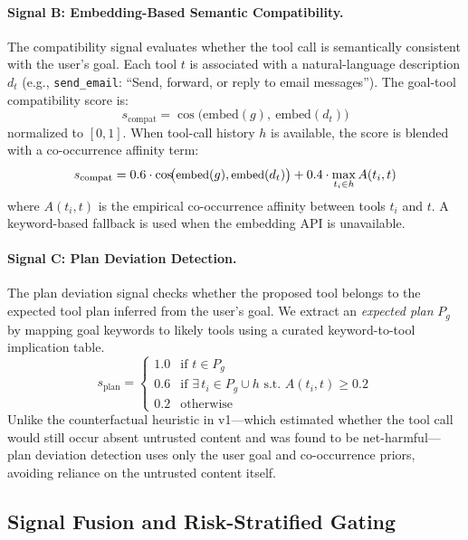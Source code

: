 \paragraph{Signal B: Embedding-Based Semantic Compatibility.}
The compatibility signal evaluates whether the tool call is semantically consistent with the user's goal.
Each tool $t$ is associated with a natural-language description $d_t$ (e.g., \texttt{send\_email}: ``Send, forward, or reply to email messages'').
The goal-tool compatibility score is:
\begin{equation}
    s_{\text{compat}} = \cos\bigl(\text{embed}(g),\ \text{embed}(d_t)\bigr)
\end{equation}
normalized to $[0, 1]$.
When tool-call history $h$ is available, the score is blended with a co-occurrence affinity term:
\begin{equation}
\small
    s_{\text{compat}} = 0.6 \cdot \cos\!\bigl(\text{embed}(g), \text{embed}(d_t)\bigr) + 0.4 \cdot \max_{t_i \in h} A(t_i, t)
\end{equation}
where $A(t_i, t)$ is the empirical co-occurrence affinity between tools $t_i$ and $t$.
A keyword-based fallback is used when the embedding API is unavailable.

\paragraph{Signal C: Plan Deviation Detection.}
The plan deviation signal checks whether the proposed tool belongs to the expected tool plan inferred from the user's goal.
We extract an \emph{expected plan} $P_g$ by mapping goal keywords to likely tools using a curated keyword-to-tool implication table.
\begin{equation}
    s_{\text{plan}} = \begin{cases}
        1.0 & \text{if } t \in P_g \\
        0.6 & \text{if } \exists\, t_i \in P_g \cup h \text{ s.t. } A(t_i, t) \geq 0.2 \\
        0.2 & \text{otherwise}
    \end{cases}
\end{equation}
Unlike the counterfactual heuristic in v1---which estimated whether the tool call would still occur absent untrusted content and was found to be net-harmful---plan deviation detection uses only the user goal and co-occurrence priors, avoiding reliance on the untrusted content itself.

\subsection{Signal Fusion and Risk-Stratified Gating}

